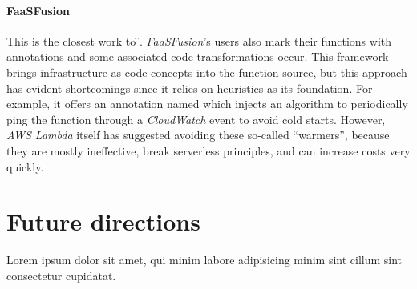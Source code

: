 \paragraph{\textbf{FaaSFusion} \cite{faasfusion}}
This is the closest work to \f{}.
\textit{FaaSFusion}'s users also mark their functions with annotations
and some associated code transformations occur.
This framework brings infrastructure-as-code concepts into the function source,
but this approach has evident shortcomings since it relies on heuristics as its foundation.
For example, it offers an annotation named  which
injects an algorithm to periodically ping the function
through a \textit{CloudWatch} event to avoid cold starts.
However, \textit{AWS Lambda} itself has suggested avoiding these so-called ``warmers'',
because they are mostly ineffective, break serverless principles, and can increase costs very quickly.

\section{Future directions}

Lorem ipsum dolor sit amet, qui minim labore adipisicing minim sint cillum sint consectetur cupidatat.
